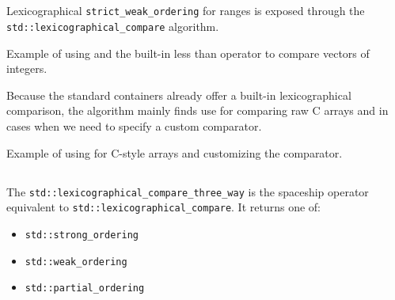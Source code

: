 \subsection{\texorpdfstring{}{\texttt{std::lexicographical\_compare}}}

Lexicographical \texttt{strict\_weak\_ordering} for ranges is exposed through the \newline\texttt{std::lexicographical\_compare} algorithm.



\begin{codebox}[breakable]{\href{https://compiler-explorer.com/z/YGW4ET1oa}{\ExternalLink}}
\footnotesize Example of using  and the built-in less than operator to compare vectors of integers.
\tcblower
{}
\end{codebox}

Because the standard containers already offer a built-in lexicographical comparison, the algorithm mainly finds use for comparing raw C arrays and in cases when we need to specify a custom comparator.

\begin{codebox}[]{\href{https://compiler-explorer.com/z/djs6TGsEs}{\ExternalLink}}
\footnotesize Example of using  for C-style arrays and customizing the comparator.
\tcblower
{}
\end{codebox}

\subsection{\texorpdfstring{}{\texttt{std::lexicographical\_compare\_three\_way}}}

The \texttt{std::lexicographical\_compare\_three\_way} is the spaceship operator equivalent to \texttt{std::lexicographical\_compare}. It returns one of:
\begin{itemize}
    \item\texttt{std::strong\_ordering}
    \item \texttt{std::weak\_ordering}
    \item \texttt{std::partial\_ordering}
\end{itemize}

